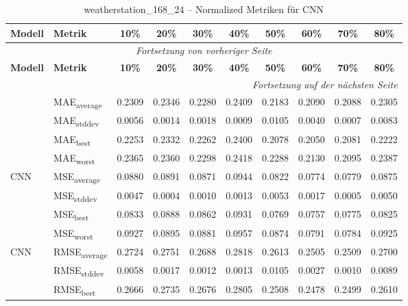 {\small
\begin{longtable}{l l c c c c c c c c}
    \toprule
    \textbf{Modell} & \textbf{Metrik} & \textbf{10\%} & \textbf{20\%} & \textbf{30\%} & \textbf{40\%} & \textbf{50\%} & \textbf{60\%} & \textbf{70\%} & \textbf{80\%} \\
    \midrule
    \endfirsthead
    \multicolumn{10}{c}{\textit{Fortsetzung von vorheriger Seite}} \\
    \toprule
    \textbf{Modell} & \textbf{Metrik} & \textbf{10\%} & \textbf{20\%} & \textbf{30\%} & \textbf{40\%} & \textbf{50\%} & \textbf{60\%} & \textbf{70\%} & \textbf{80\%} \\
    \midrule
    \endhead
    \midrule
    \multicolumn{10}{r}{\textit{Fortsetzung auf der nächsten Seite}} \\
    \midrule
    \endfoot
    \bottomrule
    \caption{weatherstation_168_24 -- Normalized Metriken für CNN}
    \label{tab:weatherstation_168_24_normalized_cnn}
    \endlastfoot
\multirow{4}{*}{CNN} & MAE\textsubscript{average} & 0.2309 & 0.2346 & 0.2280 & 0.2409 & 0.2183 & 0.2090 & 0.2088 & 0.2305 \\
 & MAE\textsubscript{stddev} & 0.0056 & 0.0014 & 0.0018 & 0.0009 & 0.0105 & 0.0040 & 0.0007 & 0.0083 \\
 & MAE\textsubscript{best} & 0.2253 & 0.2332 & 0.2262 & 0.2400 & 0.2078 & 0.2050 & 0.2081 & 0.2222 \\
 & MAE\textsubscript{worst} & 0.2365 & 0.2360 & 0.2298 & 0.2418 & 0.2288 & 0.2130 & 0.2095 & 0.2387 \\
\cmidrule(lr){2-10}
\multirow{4}{*}{CNN} & MSE\textsubscript{average} & 0.0880 & 0.0891 & 0.0871 & 0.0944 & 0.0822 & 0.0774 & 0.0779 & 0.0875 \\
 & MSE\textsubscript{stddev} & 0.0047 & 0.0004 & 0.0010 & 0.0013 & 0.0053 & 0.0017 & 0.0005 & 0.0050 \\
 & MSE\textsubscript{best} & 0.0833 & 0.0888 & 0.0862 & 0.0931 & 0.0769 & 0.0757 & 0.0775 & 0.0825 \\
 & MSE\textsubscript{worst} & 0.0927 & 0.0895 & 0.0881 & 0.0957 & 0.0874 & 0.0791 & 0.0784 & 0.0925 \\
\cmidrule(lr){2-10}
\multirow{4}{*}{CNN} & RMSE\textsubscript{average} & 0.2724 & 0.2751 & 0.2688 & 0.2818 & 0.2613 & 0.2505 & 0.2509 & 0.2700 \\
 & RMSE\textsubscript{stddev} & 0.0058 & 0.0017 & 0.0012 & 0.0013 & 0.0105 & 0.0027 & 0.0010 & 0.0089 \\
 & RMSE\textsubscript{best} & 0.2666 & 0.2735 & 0.2676 & 0.2805 & 0.2508 & 0.2478 & 0.2499 & 0.2610 \\

\end{longtable}}

